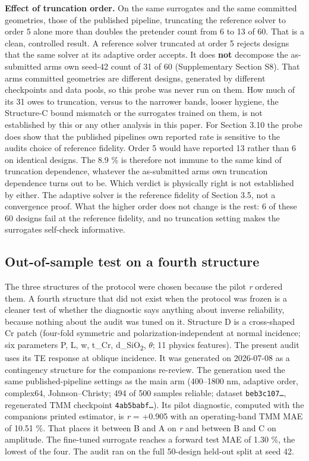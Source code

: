\documentclass[11pt,a4paper]{article}
\begin{document}
\textbf{Effect of truncation order.} On the same surrogates and the same
committed geometries, those of the published pipeline, truncating the reference solver to
order 5 alone more than doubles the pretender count from 6 to 13 of 60. That is a clean, controlled
result. A reference solver truncated at order 5 rejects designs that the same solver at
its adaptive order accepts. It does \textbf{not} decompose the as-submitted arm\textquotesingle s own seed-42
count of 31 of 60 (Supplementary Section S8). That arm\textquotesingle s committed geometries are
different designs, generated by different checkpoints and data pools, so this probe was
never run on them. How much of its 31 owes to truncation, versus to the narrower bands,
looser hygiene, the Structure-C bound mismatch or the surrogates trained on them, is
not established by this or any other analysis in this paper. For Section 3.10 the probe does show that the published pipeline\textquotesingle s own reported rate is sensitive to the audit\textquotesingle s choice of reference fidelity. Order 5 would have reported 13
rather than 6 on identical designs. The 8.9 \% is therefore not immune to the same kind of
truncation dependence, whatever the as-submitted arm\textquotesingle s own truncation dependence turns out
to be. Which verdict is physically right is not established by either. The adaptive solver
is the reference fidelity of Section 3.5, not a convergence proof. What the higher order
does not change is the rest: 6 of these 60 designs fail at the reference fidelity, and no
truncation setting makes the surrogate\textquotesingle s self-check informative.

\subsection{Out-of-sample test on a fourth structure}\label{sec:3.12}

The three structures of the protocol were chosen because the pilot \emph{r} ordered them. A
fourth structure that did not exist when the protocol was frozen is a cleaner test of
whether the diagnostic says anything about inverse reliability, because nothing about the
audit was tuned on it. Structure D is a cross-shaped Cr patch (four-fold symmetric and
polarization-independent at normal incidence; six parameters P, L, w, t\_Cr, d\_SiO\textsubscript{2}, \ensuremath{\theta}; 11
physics features). The present audit uses its TE response at oblique incidence. It was
generated on 2026-07-08 as a contingency structure for the companion\textquotesingle s re-review. The
generation used the same published-pipeline settings as the main arm (400--1800 nm,
adaptive order, complex64, Johnson--Christy; 494 of 500 samples reliable; dataset
\texttt{beb3c107\ldots{}}, regenerated TMM checkpoint \texttt{4ab5babf\ldots{}}). Its pilot diagnostic, computed with
the companion\textquotesingle s printed estimator, is \emph{r} = +0.905 with an operating-band TMM MAE of
10.51 \%. That places it between B and A on \emph{r} and between B and C on amplitude. The
fine-tuned surrogate reaches a forward test MAE of 1.30 \%, the lowest of the four. The
audit ran on the full 50-design held-out split at seed 42.
\end{document}

